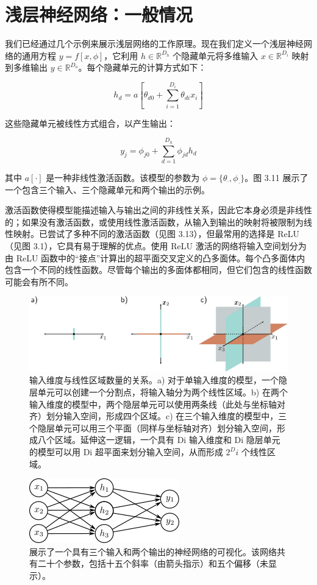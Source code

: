 \section{浅层神经网络：一般情况}

我们已经通过几个示例来展示浅层网络的工作原理。现在我们定义一个浅层神经网络的通用方程 \( y = f[x, \phi] \)，它利用 \( h \in \mathbb{R}^{D_h} \) 个隐藏单元将多维输入 \( x \in \mathbb{R}^{D_i} \) 映射到多维输出 \( y \in \mathbb{R}^{D_o} \)。每个隐藏单元的计算方式如下：

\[
h_d = a \left[ \theta_{d0} + \sum_{i=1}^{D_i} \theta_{di}x_i \right] \tag{3.11}
\]


这些隐藏单元被线性方式组合，以产生输出：

\[
y_j = \phi_{j0} + \sum_{d=1}^{D_h} \phi_{jd}h_d \tag{3.12}
\]

其中 \(a[\cdot]\)  是一种非线性激活函数。该模型的参数为 \(\phi = \{ \theta_{\cdot}, \phi_{\cdot}\}\)。图 3.11 展示了一个包含三个输入、三个隐藏单元和两个输出的示例。

激活函数使得模型能描述输入与输出之间的非线性关系，因此它本身必须是非线性的；如果没有激活函数，或使用线性激活函数，从输入到输出的映射将被限制为线性映射。已尝试了多种不同的激活函数（见图 3.13），但最常用的选择是 ReLU（见图 3.1），它具有易于理解的优点。使用 ReLU 激活的网络将输入空间划分为由 ReLU 函数中的“接点”计算出的超平面交叉定义的凸多面体。每个凸多面体内包含一个不同的线性函数。尽管每个输出的多面体都相同，但它们包含的线性函数可能会有所不同。

\begin{figure}[ht!]
	\centering
	\includegraphics[width=0.7\linewidth]{png/chapter3/ShallowHyperplanes.png}
\caption{输入维度与线性区域数量的关系。a) 对于单输入维度的模型，一个隐层单元可以创建一个分割点，将输入轴分为两个线性区域。b) 在两个输入维度的模型中，两个隐层单元可以使用两条线（此处与坐标轴对齐）划分输入空间，形成四个区域。c) 在三个输入维度的模型中，三个隐层单元可以用三个平面（同样与坐标轴对齐）划分输入空间，形成八个区域。延伸这一逻辑，一个具有 Di 输入维度和 Di 隐层单元的模型可以用 Di 超平面来划分输入空间，从而形成 $2^Di$ 个线性区域。}
\end{figure}

\begin{figure}[ht!]
	\centering
	\includegraphics[width=0.7\linewidth]{png/chapter3/ShallowNetThreeInputsTwoOutputs.png}
\caption{展示了一个具有三个输入和两个输出的神经网络的可视化。该网络共有二十个参数，包括十五个斜率（由箭头指示）和五个偏移（未显示）。}
\end{figure}

